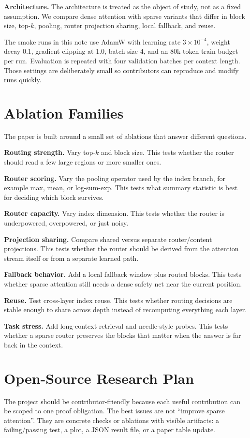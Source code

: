 \documentclass[11pt]{article}
\begin{document}
\textbf{Architecture.} The architecture is treated as the object of study, not as a fixed assumption. We compare dense attention with sparse variants that differ in block size, top-$k$, pooling, router projection sharing, local fallback, and reuse.

The smoke runs in this note use AdamW with learning rate $3\times10^{-4}$, weight decay 0.1, gradient clipping at 1.0, batch size 4, and an 80k-token train budget per run.
Evaluation is repeated with four validation batches per context length.
Those settings are deliberately small so contributors can reproduce and modify runs quickly.

\section{Ablation Families}
The paper is built around a small set of ablations that answer different questions.

\textbf{Routing strength.} Vary top-$k$ and block size. This tests whether the router should read a few large regions or more smaller ones.

\textbf{Router scoring.} Vary the pooling operator used by the index branch, for example max, mean, or log-sum-exp. This tests what summary statistic is best for deciding which block survives.

\textbf{Router capacity.} Vary index dimension. This tests whether the router is underpowered, overpowered, or just noisy.

\textbf{Projection sharing.} Compare shared versus separate router/content projections. This tests whether the router should be derived from the attention stream itself or from a separate learned path.

\textbf{Fallback behavior.} Add a local fallback window plus routed blocks. This tests whether sparse attention still needs a dense safety net near the current position.

\textbf{Reuse.} Test cross-layer index reuse. This tests whether routing decisions are stable enough to share across depth instead of recomputing everything each layer.

\textbf{Task stress.} Add long-context retrieval and needle-style probes. This tests whether a sparse router preserves the blocks that matter when the answer is far back in the context.

\section{Open-Source Research Plan}
The project should be contributor-friendly because each useful contribution can be scoped to one proof obligation.
The best issues are not ``improve sparse attention''.
They are concrete checks or ablations with visible artifacts: a failing/passing test, a plot, a JSON result file, or a paper table update.
\end{document}
